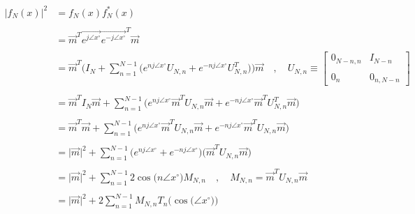 \documentclass{article}
\begin{document}
\begin{align*}
    \Big|f_{N}(x)\Big|^{2}&= f_{N}(x)f^{*}_{N}(x) \\ \\
                          &= \vec{m}^{T}\vec{e^{j\angle{x}^{\circ}}}\vec{e^{-j\angle{x}^{\circ}}}^{T}\vec{m} \\ \\
                          &= \vec{m}^{T}\Bigg(I_{N} + \sum_{n=1}^{N - 1}\Big(e^{nj\angle{x}^{\circ}}U_{N, n} + e^{-nj\angle{x}^{\circ}}U_{N, n}^{T}\Big)\Bigg)\vec{m} \quad , \quad U_{N, n} \equiv \begin{bmatrix}
                                                                                                                                                                                                        0_{N - n, n} & I_{N - n} \\ \\
                                                                                                                                                                                                        0_{n} & 0_{n, N - n}
                                                                                                                                                                                                      \end{bmatrix} \\ \\
                          &= \vec{m}^{T}I_{N}\vec{m} + \sum_{n=1}^{N - 1}\Bigg(e^{nj\angle{x}^{\circ}}\vec{m}^{T}U_{N, n}\vec{m} + e^{-nj\angle{x}^{\circ}}\vec{m}^{T}U_{N, n}^{T}\vec{m}\Bigg) \\ \\
                          &= \vec{m}^{T}\vec{m} + \sum_{n=1}^{N - 1}\Bigg(e^{nj\angle{x}^{\circ}}\vec{m}^{T}U_{N, n}\vec{m} + e^{-nj\angle{x}^{\circ}}\vec{m}^{T}U_{N, n}\vec{m}\Bigg) \\ \\
                          &= \big|\vec{m}\big|^{2} + \sum_{n=1}^{N - 1}\Big(e^{nj\angle{x}^{\circ}} + e^{-nj\angle{x}^{\circ}}\Big)\Big(\vec{m}^{T}U_{N, n}\vec{m}\Big) \\ \\
                          &= \big|\vec{m}\big|^{2} + \sum_{n=1}^{N - 1}2\cos\big(n\angle{x}^{\circ}\big)M_{N, n} \quad , \quad M_{N, n} = \vec{m}^{T}U_{N, n}\vec{m} \\ \\
                          &= \big|\vec{m}\big|^{2} + 2\sum_{n=1}^{N - 1}M_{N, n}T_{n}\Big(\cos\big(\angle{x}^{\circ}\big)\Big)
\end{align*}
\end{document}
